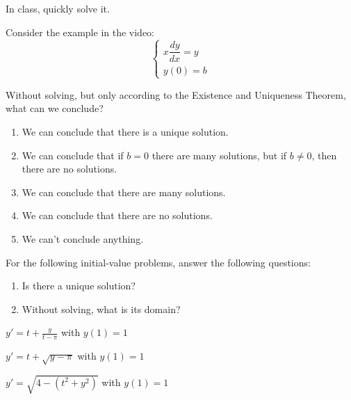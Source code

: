 

\begin{annotation}
\begin{goals}
	In class, quickly solve it.
\end{goals}	
\end{annotation}
\question \label{prop:preclass}Consider the example in the video:
$$
\begin{cases}
x \dfrac{dy}{dx} = y \\
y(0)=b
\end{cases}
$$

Without solving, but only according to the Existence and Uniqueness Theorem, what can we conclude?
\begin{enumerate}[label=\color{gray}(\alph*)]
	\item We can conclude that there is a unique solution.
	\item We can conclude that if $b=0$ there are many solutions, but if $b\neq 0$, then there are no solutions.
	\item We can conclude that there are many solutions.
	\item We can conclude that there are no solutions.
	\item We can't conclude anything.
\end{enumerate}




\bookonlynewpage

\question For the following initial-value problems, answer the following questions:
\begin{enumerate}[label=\color{gray}(\alph*)]
\item Is there a unique solution?

\item Without solving, what is its domain?
\end{enumerate}
\begin{parts}
	\item $y' = t + \frac{y}{t-\pi}$ with $y(1) = 1$
	\item $y' = t + \sqrt{y-\pi}$ with $y(1) = 1$
	\item $y' = \sqrt{4 - (t^2+y^2)}$ with $y(1) = 1$
\end{parts}






\bookonlynewpage


